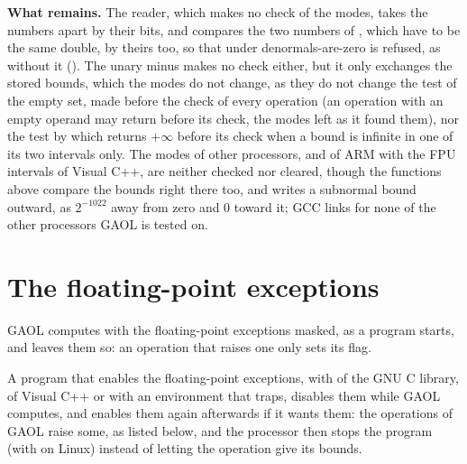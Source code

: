 \documentclass[12pt,a4paper,twoside,openright]{book}
\begin{document}
\medskip
\noindent
\textbf{What remains.} The reader, which makes no check of the modes, takes
the numbers apart by their bits, and compares the two numbers of
, which have to be the same double, by theirs too,\newinvfive{}
so that under denormals-are-zero  is refused, as
without it (). The unary minus makes no check either,
but it only exchanges the stored bounds, which the modes do not change, as
they do not change the test of the empty set, made before the check of every
operation (an operation with an empty operand may return before its check,
the modes left as it found them), nor the test by which 
returns $+\infty$ before its check when a bound is infinite in one of its two
intervals only. The modes of other processors, and of ARM with the FPU
intervals of Visual C++, are neither checked nor cleared, though the
functions above compare the bounds right there too, and 
writes a subnormal bound outward, as $2^{-1022}$ away from zero and 0 toward
it; GCC links  for none of the other processors GAOL is
tested on.

\section{The floating-point exceptions}\label{sec:fp-exceptions}
%
%

GAOL computes with the floating-point exceptions masked, as a program starts,
and leaves them so: an operation that raises one only sets its flag.

\begin{Rem}\label{rem:fp-exceptions-enabled}
A program that enables the floating-point exceptions, with
 of the GNU C library,  of
Visual C++ or  with an environment that traps, disables
them while GAOL computes, and enables them again afterwards if it wants them: the
operations of GAOL raise some, as listed below, and the processor then stops
the program (with  on Linux) instead of letting the operation
give its bounds.\newinvfive
\end{Rem}
\end{document}
